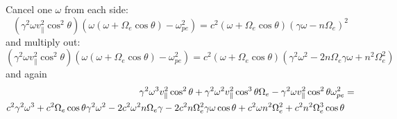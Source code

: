 \documentclass[]{article}
\begin{document}
Cancel one $\omega$ from each side:
\begin{equation}
(\gamma^2 \omega v_\parallel^2 \cos^2\theta) (\omega(\omega + \Omega_e \cos\theta) - \omega_{pe}^2) = c^2 (\omega + \Omega_e \cos\theta)(\gamma \omega - n \Omega_e)^2 \end{equation}
and multiply out:
\begin{equation}
(\gamma^2 \omega v_\parallel^2 \cos^2\theta) (\omega(\omega + \Omega_e \cos\theta) - \omega_{pe}^2) = c^2 (\omega + \Omega_e \cos\theta)(\gamma^2 \omega^2 -2 n \Omega_e \gamma \omega + n^2 \Omega_e^2) \end{equation}
and again
\begin{align}
\gamma^2\omega^3 v_\parallel^2 \cos^2 \theta + \gamma^2 \omega^2 v_\parallel^2 \cos^3\theta\Omega_e - \gamma^2\omega v_\parallel^2\cos^2\theta\omega_{pe}^2 &=\notag\\ c^2\gamma^2 \omega^3 + c^2 \Omega_e\cos\theta \gamma^2\omega^2 - 2 c^2 \omega^2 n\Omega_e\gamma - 2 c^2 n \Omega_e^2 \gamma\omega\cos\theta + c^2 \omega n^2\Omega_e^2 + c^2 n^2\Omega_e^3\cos\theta &
\end{align}
\end{document}
